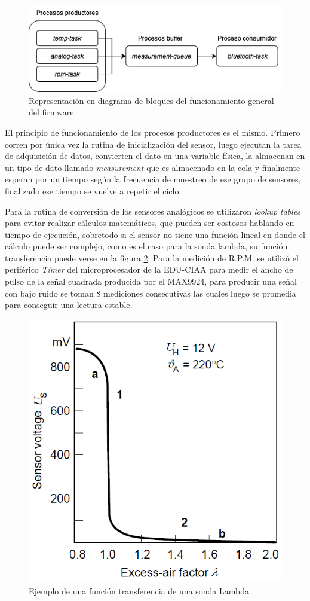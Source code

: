 \begin{figure}[htpb]
\centering
\includegraphics[width=.8\textwidth]{./Figures/diagrama-firmware.png}
\caption{Representación en diagrama de bloques del funcionamiento general del firmware.}
\label{fig:diagrama-firmware}
\end{figure}

El principio de funcionamiento de los procesos productores es el mismo. Primero corren por única vez la rutina de inicialización del sensor, luego ejecutan la tarea de adquisición de datos, convierten el dato en una variable física, la almacenan en un tipo de dato llamado \textit{measurement} que es almacenado en la cola y finalmente esperan por un tiempo según la frecuencia de muestreo de ese grupo de sensores, finalizado ese tiempo se vuelve a repetir el ciclo.

Para la rutina de conversión de los sensores analógicos se utilizaron \textit{lookup tables} para evitar realizar cálculos matemáticos, que pueden ser costosos hablando en tiempo de ejecución, sobretodo si el sensor no tiene una función lineal en donde el cálculo puede ser complejo, como es el caso para la sonda lambda, su función transferencia puede verse en la figura \ref{fig:funcion-lambda}. Para la medición de R.P.M. se utilizó el periférico \textit{Timer} del microprocesador de la EDU-CIAA para medir el ancho de pulso de la señal cuadrada producida por el MAX9924, para producir una señal con bajo ruido se toman 8 mediciones consecutivas las cuales luego se promedia para conseguir una lectura estable.

\begin{figure}[htpb]
\centering
\includegraphics[width=.55\textwidth]{./Figures/funcion-lambda.png}
\caption{Ejemplo de una función transferencia de una sonda Lambda \protect\footnotemark[3].}
\label{fig:funcion-lambda}
\end{figure}


